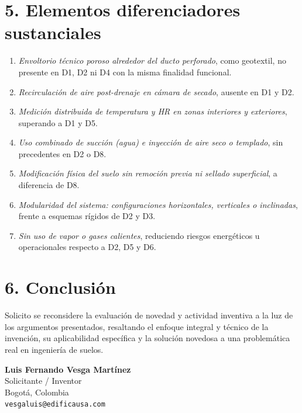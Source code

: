 \documentclass[12pt]{article}
\begin{document}
\section*{5. Elementos diferenciadores sustanciales}

\begin{enumerate}
    \item \textit{Envoltorio técnico poroso alrededor del ducto perforado}, como geotextil, no presente en D1, D2 ni D4 con la misma finalidad funcional.
    \item \textit{Recirculación de aire post-drenaje en cámara de secado}, ausente en D1 y D2.
    \item \textit{Medición distribuida de temperatura y HR en zonas interiores y exteriores}, superando a D1 y D5.
    \item \textit{Uso combinado de succión (agua) e inyección de aire seco o templado}, sin precedentes en D2 o D8.
    \item \textit{Modificación física del suelo sin remoción previa ni sellado superficial}, a diferencia de D8.
    \item \textit{Modularidad del sistema: configuraciones horizontales, verticales o inclinadas}, frente a esquemas rígidos de D2 y D3.
    \item \textit{Sin uso de vapor o gases calientes}, reduciendo riesgos energéticos u operacionales respecto a D2, D5 y D6.
\end{enumerate}

\section*{6. Conclusión}

Solicito se reconsidere la evaluación de novedad y actividad inventiva a la luz de los argumentos presentados, resaltando el enfoque integral y técnico de la invención, su aplicabilidad específica y la solución novedosa a una problemática real en ingeniería de suelos.

\vspace{2em}
\noindent
\textbf{Luis Fernando Vesga Martínez} \\
Solicitante / Inventor \\
Bogotá, Colombia \\
\texttt{vesgaluis@edificausa.com}
\end{document}
